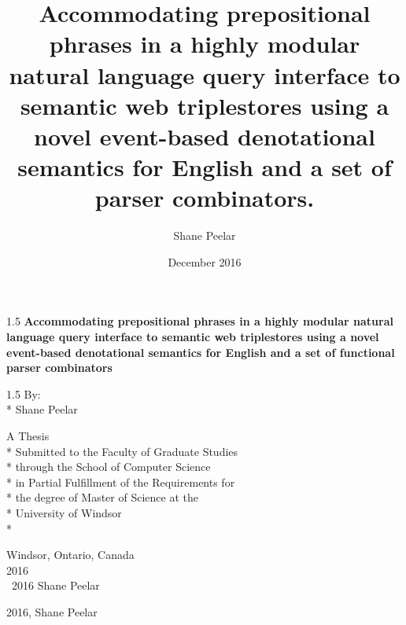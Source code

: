\documentclass[fleqn, oneside, 12pt]{book}
\author{Shane Peelar}
\title{Accommodating prepositional phrases in a highly modular
	natural language query interface to semantic web triplestores using a novel event-based denotational semantics for English and a set of parser combinators.}
\date{December 2016}
\theoremstyle{definitionsty}
\newcommand{\uwinonehalfspacelen}{1.5}
\newenvironment{uwinonehalfspaceenv}%
{\begin{spacing}{\uwinonehalfspacelen}}%
	{\end{spacing}}
\begin{document}
	
\renewcommand{\gitMark}{
	Branch: \gitBranch\,@\,\gitAbbrevHash{} 
	\textbullet{} 
	Release:\gitReln{} 
	(\gitAuthorDate)
}
	


\clearpage

\thispagestyle{empty}
\begin{center}
	\vspace*{1in}
	
	\begin{uwinonehalfspaceenv}
		\Large\textbf{Accommodating prepositional phrases in a highly modular
			natural language query interface to semantic web triplestores using a novel event-based denotational semantics for English and a set of functional parser combinators}
	\end{uwinonehalfspaceenv}
	
	\vspace{\fill} %
	\begin{uwinonehalfspaceenv}
		By:\\*
		Shane Peelar
	\end{uwinonehalfspaceenv}
	\vspace{\fill}
	
	\normalsize
	A Thesis \\*
	Submitted to the Faculty of Graduate Studies \\*
	through the School of Computer Science \\*
	in Partial Fulfillment of the Requirements for \\*
	the degree of Master of Science at the \\*
	University of Windsor \\*
	
	\vspace{1in}
	Windsor, Ontario, Canada \\
	\vspace{0.5cm}
	2016 \\
	\vspace{0.5cm}
	\textcopyright \  2016 Shane Peelar
\end{center}



\clearpage
\thispagestyle{empty}

\vspace*{\fill}

\noindent \textcopyright{} 2016, Shane Peelar

\vspace{2ex}
\end{document}
